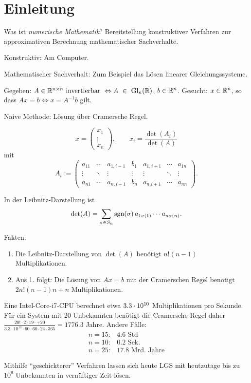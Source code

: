 \section{Einleitung}
Was ist \emph{numerische Mathematik}? Bereitstellung konstruktiver Verfahren zur approximativen Berechnung mathematischer Sachverhalte.

Konstruktiv: Am Computer.

Mathematischer Sachverhalt: Zum Beispiel das Lösen linearer Gleichungssysteme.

\begin{Beispiel}

Gegeben: $A \in \mathbb R^{n\times n} \text{ invertierbar } \Leftrightarrow A~\in~\mathrm{Gl}_n(\mathbb R)$,
$b \in \mathbb R^n$.
Gesucht: $x \in \mathbb R^n$, so dass $Ax = b \Leftrightarrow x = A^{-1} b$ gilt.

Naive Methode: Lösung über Cramersche Regel.

$$x = \begin{pmatrix}x_1 \\ \vdots \\ x_n \end{pmatrix}, \qquad x_i = \frac{\det(A_i)}{\det(A)}$$
mit $$A_i :=
\begin{pmatrix}
  a_{11} & \cdots & a_{1,i-1} & b_1 & a_{1,i+1} & \cdots & a_{1n} \\
  \vdots & \ddots & \vdots & \vdots & \vdots & \ddots & \vdots \\
  a_{n1} & \cdots & a_{n,i-1} & b_n & a_{n.i+1} & \cdots & a_{nn}
\end{pmatrix}.$$

In der Leibnitz-Darstellung ist $$\det(A) = \sum_{\sigma\in S_n} \operatorname*{\mathrm{sgn}}(\sigma)\, a_{1\sigma(1)} \cdots a_{n\sigma(n)}.$$

Fakten:
\begin{enumerate}
\item Die Leibnitz-Darstellung von $\det(A)$ benötigt $n! (n-1)$ Multiplikationen.
\item Aus 1. folgt: Die Lösung von $Ax=b$ mit der Cramerschen Regel benötigt $2n!(n-1)n + n$
      Multiplikationen.
\end{enumerate}

Eine Intel-Core-i7-CPU berechnet etwa $3.3\cdot 10^{10}$ Multiplikationen pro Sekunde.
Für ein System mit 20 Unbekannten benötigt die Cramersche Regel daher
$ \frac{20! \cdot 2 \cdot 19 \cdot +20}{3.3 \cdot 10^{10} 
\cdot 60 \cdot 60 \cdot 24 \cdot 365} = 1776.3$ Jahre.
Andere Fälle:
\begin{align*}
n = 15\colon & 4.6\text{ Std}\\
n = 10\colon & 0.2\text{ Sek.}\\
n = 25\colon & 17.8\text{ Mrd. Jahre}
\end{align*}

Mithilfe "`geschickterer"' Verfahren lassen sich heute LGS mit heutzutage bis zu $10^9$
Unbekannten in vernüftiger Zeit lösen.
\end{Beispiel}

